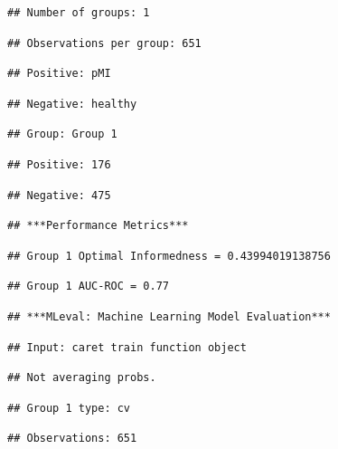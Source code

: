 \documentclass[
]{article}
\begin{document}
\begin{verbatim}
## Number of groups: 1
\end{verbatim}

\begin{verbatim}
## Observations per group: 651
\end{verbatim}

\begin{verbatim}
## Positive: pMI
\end{verbatim}

\begin{verbatim}
## Negative: healthy
\end{verbatim}

\begin{verbatim}
## Group: Group 1
\end{verbatim}

\begin{verbatim}
## Positive: 176
\end{verbatim}

\begin{verbatim}
## Negative: 475
\end{verbatim}

\begin{verbatim}
## ***Performance Metrics***
\end{verbatim}

\begin{verbatim}
## Group 1 Optimal Informedness = 0.43994019138756
\end{verbatim}

\begin{verbatim}
## Group 1 AUC-ROC = 0.77
\end{verbatim}

\begin{verbatim}
## ***MLeval: Machine Learning Model Evaluation***
\end{verbatim}

\begin{verbatim}
## Input: caret train function object
\end{verbatim}

\begin{verbatim}
## Not averaging probs.
\end{verbatim}

\begin{verbatim}
## Group 1 type: cv
\end{verbatim}

\begin{verbatim}
## Observations: 651
\end{verbatim}
\end{document}
